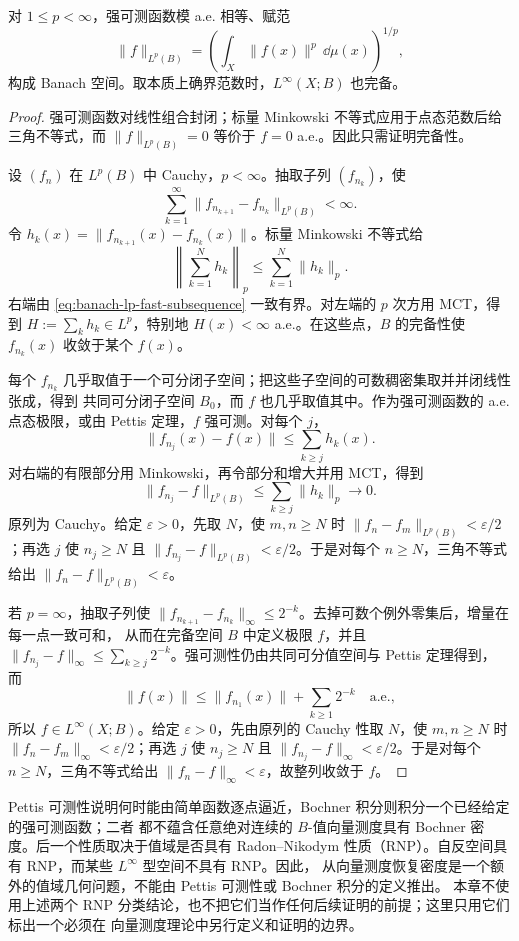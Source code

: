 \begin{proposition}\label{proposition:3-4-2-4}
对 $1\le p<\infty$，强可测函数模 a.e. 相等、赋范
\[
 \|f\|_{L^p(B)}=\left(\int_X\|f(x)\|^p\,\dd\mu(x)\right)^{1/p},
\]
构成 Banach 空间。取本质上确界范数时，$L^\infty(X;B)$ 也完备。
\end{proposition}

\begin{proof}
强可测函数对线性组合封闭；标量 Minkowski 不等式应用于点态范数后给三角不等式，而
$\|f\|_{L^p(B)}=0$ 等价于 $f=0$ a.e.。因此只需证明完备性。

设 $(f_n)$ 在 $L^p(B)$ 中 Cauchy，$p<\infty$。抽取子列 $(f_{n_k})$，使
\[
 \sum_{k=1}^{\infty}\|f_{n_{k+1}}-f_{n_k}\|_{L^p(B)}<\infty.
 \tag{3.4.14}\label{eq:banach-lp-fast-subsequence}
\]
令 $h_k(x)=\|f_{n_{k+1}}(x)-f_{n_k}(x)\|$。标量 Minkowski 不等式给
\[
 \left\|\sum_{k=1}^Nh_k\right\|_p
 \le\sum_{k=1}^N\|h_k\|_p.
\]
右端由 \eqref{eq:banach-lp-fast-subsequence} 一致有界。对左端的 $p$ 次方用 MCT，得到
$H:=\sum_kh_k\in L^p$，特别地 $H(x)<\infty$ a.e.。在这些点，$B$ 的完备性使
$f_{n_k}(x)$ 收敛于某个 $f(x)$。

每个 $f_{n_k}$ 几乎取值于一个可分闭子空间；把这些子空间的可数稠密集取并并闭线性张成，得到
共同可分闭子空间 $B_0$，而 $f$ 也几乎取值其中。作为强可测函数的 a.e. 点态极限，或由 Pettis
定理，$f$ 强可测。对每个 $j$，
\[
 \|f_{n_j}(x)-f(x)\|
 \le\sum_{k\ge j}h_k(x).
\]
对右端的有限部分用 Minkowski，再令部分和增大并用 MCT，得到
\[
 \|f_{n_j}-f\|_{L^p(B)}
 \le\sum_{k\ge j}\|h_k\|_p\longrightarrow0.
\]
原列为 Cauchy。给定 $\varepsilon>0$，先取 $N$，使 $m,n\ge N$ 时
$\|f_n-f_m\|_{L^p(B)}<\varepsilon/2$；再选 $j$ 使 $n_j\ge N$ 且
$\|f_{n_j}-f\|_{L^p(B)}<\varepsilon/2$。于是对每个 $n\ge N$，三角不等式给出
$\|f_n-f\|_{L^p(B)}<\varepsilon$。

若 $p=\infty$，抽取子列使
$\|f_{n_{k+1}}-f_{n_k}\|_\infty\le2^{-k}$。去掉可数个例外零集后，增量在每一点一致可和，
从而在完备空间 $B$ 中定义极限 $f$，并且
$\|f_{n_j}-f\|_\infty\le\sum_{k\ge j}2^{-k}$。强可测性仍由共同可分值空间与 Pettis 定理得到，
而
\[
  \|f(x)\|\le \|f_{n_1}(x)\|+\sum_{k\ge1}2^{-k}
  \quad\text{a.e.},
\]
所以 $f\in L^\infty(X;B)$。给定 $\varepsilon>0$，先由原列的 Cauchy 性取 $N$，使
$m,n\ge N$ 时 $\|f_n-f_m\|_\infty<\varepsilon/2$；再选 $j$ 使 $n_j\ge N$ 且
$\|f_{n_j}-f\|_\infty<\varepsilon/2$。于是对每个 $n\ge N$，三角不等式给出
$\|f_n-f\|_\infty<\varepsilon$，故整列收敛于 $f$。
\end{proof}

\begin{remark}
Pettis 可测性说明何时能由简单函数逐点逼近，Bochner 积分则积分一个已经给定的强可测函数；二者
都不蕴含任意绝对连续的 $B$-值向量测度具有 Bochner 密度。后一个性质取决于值域是否具有
Radon--Nikodym 性质（RNP）。自反空间具有 RNP，而某些 $L^\infty$ 型空间不具有 RNP。因此，
从向量测度恢复密度是一个额外的值域几何问题，不能由 Pettis 可测性或 Bochner 积分的定义推出。
本章不使用上述两个 RNP 分类结论，也不把它们当作任何后续证明的前提；这里只用它们标出一个必须在
向量测度理论中另行定义和证明的边界。
\end{remark}


